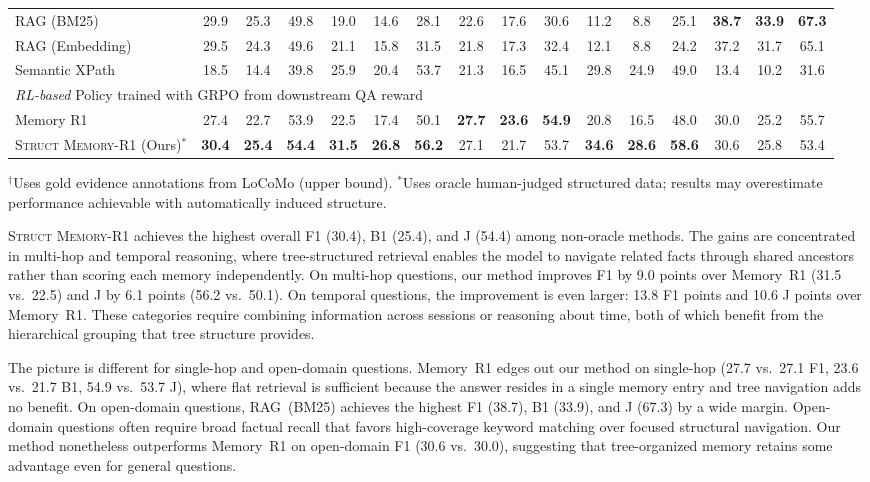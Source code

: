 \begin{table}[t]
\begin{tabular}{l @{\hskip 5pt} ccc @{\hskip 3pt} ccc @{\hskip 3pt} ccc @{\hskip 3pt} ccc @{\hskip 3pt} ccc}
RAG (BM25) & 29.9 & 25.3 & 49.8 & 19.0 & 14.6 & 28.1 & 22.6 & 17.6 & 30.6 & 11.2 & 8.8 & 25.1 & \textbf{38.7} & \textbf{33.9} & \textbf{67.3} \\
RAG (Embedding) & 29.5 & 24.3 & 49.6 & 21.1 & 15.8 & 31.5 & 21.8 & 17.3 & 32.4 & 12.1 & 8.8 & 24.2 & 37.2 & 31.7 & 65.1 \\
Semantic XPath & 18.5 & 14.4 & 39.8 & 25.9 & 20.4 & 53.7 & 21.3 & 16.5 & 45.1 & 29.8 & 24.9 & 49.0 & 13.4 & 10.2 & 31.6 \\
\midrule
\multicolumn{16}{l}{\textit{RL-based} \hfill \scriptsize Policy trained with GRPO from downstream QA reward} \\[2pt]
Memory R1 & 27.4 & 22.7 & 53.9 & 22.5 & 17.4 & 50.1 & \textbf{27.7} & \textbf{23.6} & \textbf{54.9} & 20.8 & 16.5 & 48.0 & 30.0 & 25.2 & 55.7 \\
\rowcolor{rowOurs}\textsc{Struct Memory-R1} (Ours)$^*$ & \textbf{30.4} & \textbf{25.4} & \textbf{54.4} & \textbf{31.5} & \textbf{26.8} & \textbf{56.2} & 27.1 & 21.7 & 53.7 & \textbf{34.6} & \textbf{28.6} & \textbf{58.6} & 30.6 & 25.8 & 53.4 \\
\bottomrule
\end{tabular}
\vspace{2pt}

{\footnotesize $^\dagger$Uses gold evidence annotations from LoCoMo (upper bound). $^*$Uses oracle human-judged structured data; results may overestimate performance achievable with automatically induced structure.}
\end{table}

\textsc{Struct Memory-R1} achieves the highest overall F1 (30.4), B1 (25.4), and J (54.4) among non-oracle methods. The gains are concentrated in multi-hop and temporal reasoning, where tree-structured retrieval enables the model to navigate related facts through shared ancestors rather than scoring each memory independently. On multi-hop questions, our method improves F1 by 9.0 points over Memory~R1 (31.5 vs.\ 22.5) and J by 6.1 points (56.2 vs.\ 50.1). On temporal questions, the improvement is even larger: 13.8 F1 points and 10.6 J points over Memory~R1. These categories require combining information across sessions or reasoning about time, both of which benefit from the hierarchical grouping that tree structure provides.

The picture is different for single-hop and open-domain questions. Memory~R1 edges out our method on single-hop (27.7 vs.\ 27.1 F1, 23.6 vs.\ 21.7 B1, 54.9 vs.\ 53.7 J), where flat retrieval is sufficient because the answer resides in a single memory entry and tree navigation adds no benefit. On open-domain questions, RAG~(BM25) achieves the highest F1 (38.7), B1 (33.9), and J (67.3) by a wide margin. Open-domain questions often require broad factual recall that favors high-coverage keyword matching over focused structural navigation. Our method nonetheless outperforms Memory~R1 on open-domain F1 (30.6 vs.\ 30.0), suggesting that tree-organized memory retains some advantage even for general questions.


